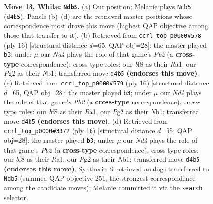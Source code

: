 \documentclass[11pt]{article}
\begin{document}
\begin{figure}[p]
\caption{\textbf{Move 13, White: \texttt{Ndb5}.} (a) Our position; Melanie plays \texttt{Ndb5} (\texttt{d4b5}). Panels (b)--(d) are the retrieved master positions whose correspondence most drove this move (highest QAP objective among those that transfer to it). (b) Retrieved from \texttt{ccrl\_top\_p0000\#578} (ply 16) [structural distance $d$=65, QAP obj=28]: the master played \texttt{b3}; under $\mu$ our \emph{Nd4} plays the role of that game's \emph{Pb2} (a \textbf{cross-type} correspondence); cross-type roles: our \emph{b}f8 as their \emph{R}a1, our \emph{P}g2 as their \emph{N}b1; transferred move \texttt{d4b5} \textbf{(endorses this move)}. (c) Retrieved from \texttt{ccrl\_top\_p0000\#579} (ply 16) [structural distance $d$=65, QAP obj=28]: the master played \texttt{b3}; under $\mu$ our \emph{Nd4} plays the role of that game's \emph{Pb2} (a \textbf{cross-type} correspondence); cross-type roles: our \emph{b}f8 as their \emph{R}a1, our \emph{P}g2 as their \emph{N}b1; transferred move \texttt{d4b5} \textbf{(endorses this move)}. (d) Retrieved from \texttt{ccrl\_top\_p0000\#3372} (ply 16) [structural distance $d$=65, QAP obj=28]: the master played \texttt{b3}; under $\mu$ our \emph{Nd4} plays the role of that game's \emph{Pb2} (a \textbf{cross-type} correspondence); cross-type roles: our \emph{b}f8 as their \emph{R}a1, our \emph{P}g2 as their \emph{N}b1; transferred move \texttt{d4b5} \textbf{(endorses this move)}. Synthesis: 9 retrieved analogs transferred to \texttt{Ndb5} (summed QAP objective 251, the strongest correspondence among the candidate moves); Melanie committed it via the \texttt{search} selector.}
\label{fig:thought-m24}
\end{figure}

\clearpage
\end{document}
